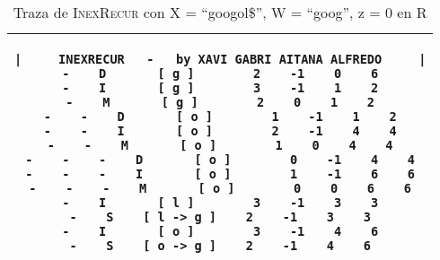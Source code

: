 \documentclass{article}
\newcommand{\tempcaption}{}
\newenvironment{code}[4]
{
\begin{table}[h!]
\gdef\tempcaption{Traza de \textsc{InexRecur} con X = ``#1'', W = ``#2'', z = #3 en #4}
\centering
\begin{tabular}{|c|}
\hline
}
{
\\\hline
\end{tabular}
\caption{\tempcaption}
\end{table}
}
\begin{document}
\vfill
\begin{code}{googol\$}{goog}{0}{R}
\begin{lstlisting}
|     INEXRECUR   -   by XAVI GABRI AITANA ALFREDO     |
-    D       [ g ]        2    -1    0    6
-    I       [ g ]        3    -1    1    2
-    M       [ g ]        2    0    1    2
-    -    D       [ o ]        1    -1    1    2
-    -    I       [ o ]        2    -1    4    4
-    -    M       [ o ]        1    0    4    4
-    -    -    D       [ o ]        0    -1    4    4
-    -    -    I       [ o ]        1    -1    6    6
-    -    -    M       [ o ]        0    0    6    6
-    I       [ l ]        3    -1    3    3
-    S    [ l -> g ]    2    -1    3    3
-    I       [ o ]        3    -1    4    6
-    S    [ o -> g ]    2    -1    4    6
\end{lstlisting}
\end{code}
\vfill
\end{document}
